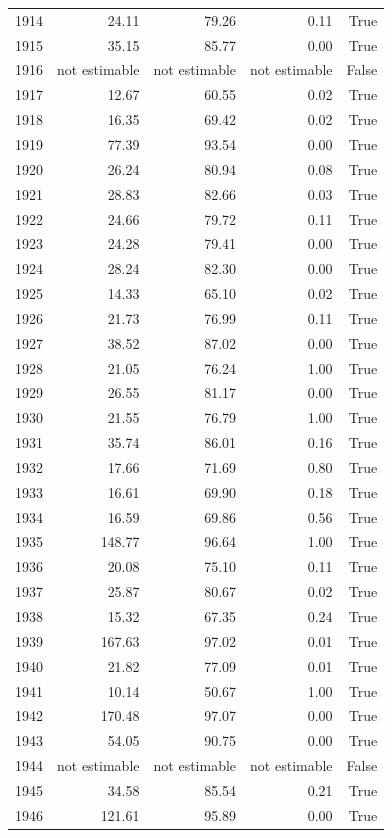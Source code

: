 \begin{longtable}{rrrrr}
1914 & 24.11 & 79.26 & 0.11 & True \\
1915 & 35.15 & 85.77 & 0.00 & True \\
1916 & not estimable & not estimable & not estimable & False \\
1917 & 12.67 & 60.55 & 0.02 & True \\
1918 & 16.35 & 69.42 & 0.02 & True \\
1919 & 77.39 & 93.54 & 0.00 & True \\
1920 & 26.24 & 80.94 & 0.08 & True \\
1921 & 28.83 & 82.66 & 0.03 & True \\
1922 & 24.66 & 79.72 & 0.11 & True \\
1923 & 24.28 & 79.41 & 0.00 & True \\
1924 & 28.24 & 82.30 & 0.00 & True \\
1925 & 14.33 & 65.10 & 0.02 & True \\
1926 & 21.73 & 76.99 & 0.11 & True \\
1927 & 38.52 & 87.02 & 0.00 & True \\
1928 & 21.05 & 76.24 & 1.00 & True \\
1929 & 26.55 & 81.17 & 0.00 & True \\
1930 & 21.55 & 76.79 & 1.00 & True \\
1931 & 35.74 & 86.01 & 0.16 & True \\
1932 & 17.66 & 71.69 & 0.80 & True \\
1933 & 16.61 & 69.90 & 0.18 & True \\
1934 & 16.59 & 69.86 & 0.56 & True \\
1935 & 148.77 & 96.64 & 1.00 & True \\
1936 & 20.08 & 75.10 & 0.11 & True \\
1937 & 25.87 & 80.67 & 0.02 & True \\
1938 & 15.32 & 67.35 & 0.24 & True \\
1939 & 167.63 & 97.02 & 0.01 & True \\
1940 & 21.82 & 77.09 & 0.01 & True \\
1941 & 10.14 & 50.67 & 1.00 & True \\
1942 & 170.48 & 97.07 & 0.00 & True \\
1943 & 54.05 & 90.75 & 0.00 & True \\
1944 & not estimable & not estimable & not estimable & False \\
1945 & 34.58 & 85.54 & 0.21 & True \\
1946 & 121.61 & 95.89 & 0.00 & True \\

\end{longtable}
